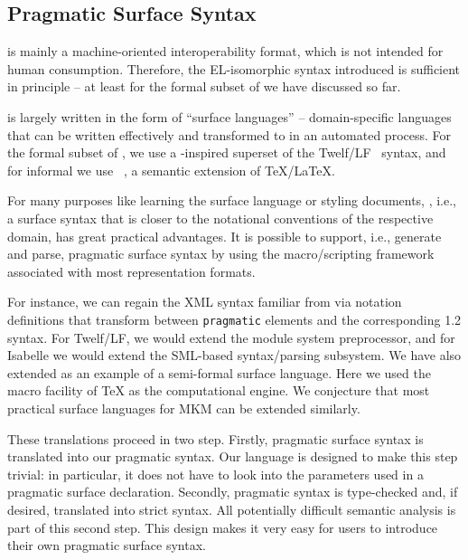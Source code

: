 \subsection{Pragmatic Surface Syntax}

\omdoc is mainly a machine-oriented interoperability format, which is not intended for
human consumption. Therefore, the EL-isomorphic syntax introduced is sufficient in
principle -- at least for the formal subset of \omdoc we have discussed so far.

\omdoc is largely written in the form of ``surface languages'' -- domain-specific
languages that can be written effectively and transformed to \omdoc in an automated
process. For the formal subset of \omdoc, we use a \mmt-inspired superset of the
Twelf/LF~\cite{twelf,lf} syntax, and for informal \omdoc we use
\sTeX~\cite{Kohlhase:ulsmf08}, a semantic extension of {\TeX/\LaTeX}. 

For many
purposes like learning the surface language or styling \omdoc documents,
, i.e., a surface syntax that is closer to the
notational conventions of the respective domain, has great practical advantages.
It is possible to support, i.e., generate and parse, pragmatic surface
syntax by using the macro/scripting framework associated with most representation
formats.

For instance, we can regain the XML syntax familiar from 
via notation definitions that transform between \lstinline|pragmatic| elements and the
corresponding {\omdoc} 1.2 syntax. For Twelf/LF, we would extend the module system preprocessor, and for Isabelle we would extend the
SML-based syntax/parsing subsystem. We have also extended \sTeX as an example of a
semi-formal surface language. Here we used the
macro facility of {\TeX} as the computational engine. We conjecture that most practical
surface languages for MKM can be extended similarly.

These translations proceed in two step. Firstly, pragmatic surface syntax is translated into our pragmatic {\mmt} syntax. Our language is designed to make this step trivial: in particular, it does not have to look into the parameters used in a pragmatic surface declaration.
Secondly, pragmatic {\mmt} syntax is type-checked and, if desired, translated into strict {\mmt} syntax.
All potentially difficult semantic analysis is part of this second step.
This design makes it very easy for users to introduce their own pragmatic surface syntax.



